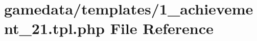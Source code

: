 \hypertarget{1__achievement__21_8tpl_8php}{\section{gamedata/templates/1\+\_\+achievement\+\_\+21.tpl.\+php File Reference}
\label{1__achievement__21_8tpl_8php}
}
